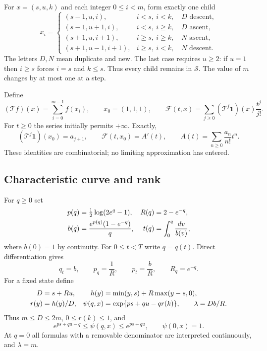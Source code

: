 \documentclass[11pt,letterpaper]{article}
\theoremstyle{remark}
\newcommand{\TT}{\mathcal T}
\newcommand{\FF}{\mathcal F}
\newcommand{\one}{\mathbf 1}
\newcommand{\calS}{\mathcal S}
\begin{document}
For $x=(s,u,k)$ and each integer $0\le i<m$, form exactly one child
\begin{equation}\label{a58:fn:eq:children}
 x_i=\begin{cases}
 (s-1,u,i),&i<s,\ i<k,\quad D\text{ descent},\\
 (s-1,u+1,i),&i<s,\ i\ge k,\quad D\text{ ascent},\\
 (s+1,u,i+1),&i\ge s,\ i\ge k,\quad N\text{ ascent},\\
 (s+1,u-1,i+1),&i\ge s,\ i<k,\quad N\text{ descent}.
 \end{cases}
\end{equation}
The letters $D,N$ mean duplicate and new. The last case requires $u\ge2$: if $u=1$ then $i\ge s$ forces $i=s$ and $k\le s$. Thus every child remains in $\calS$. The value of $m$ changes by at most one at a step.

Define
\begin{equation}\label{a58:fn:eq:operator}
 (\TT f)(x)=\sum_{i=0}^{m-1}f(x_i),\qquad x_0=(1,1,1),\qquad
 \FF(t,x)=\sum_{j\ge0}(\TT^j\one)(x)\frac{t^j}{j!}.
\end{equation}
For $t\ge0$ the series initially permits $+\infty$. Exactly,
\[
 (\TT^j\one)(x_0)=a_{j+1},\qquad
 \FF(t,x_0)=A'(t),\qquad A(t)=\sum_{n\ge0}\frac{a_n}{n!}t^n.
\]
These identities are combinatorial; no limiting approximation has entered.

\subsection{Characteristic curve and rank}
For $q\ge0$ set
\begin{align}\label{a58:fn:eq:params}
 p(q)&=\tfrac12\log(2e^q-1),& R(q)&=2-e^{-q},\notag\\
 b(q)&=\frac{e^{p(q)}(1-e^{-q})}{q},&
 t(q)&=\int_0^q\frac{dv}{b(v)},
\end{align}
where $b(0)=1$ by continuity. For $0\le t<T$ write $q=q(t)$. Direct differentiation gives
\begin{equation}\label{a58:fn:eq:flow}
 q_t=b,\qquad p_q=\frac1R,\qquad p_t=\frac bR,
 \qquad R_q=e^{-q}.
\end{equation}
For a fixed state define
\begin{align}\label{a58:fn:eq:profile}
 D&=s+Ru,& h(y)&=\min(y,s)+R\max(y-s,0),\notag\\
 r(y)&=h(y)/D,& \psi(q,x)&=\exp\{ps+qu-qr(k)\},\qquad
 \lambda=Db/R.
\end{align}
Thus $m\le D\le2m$, $0\le r(k)\le1$, and
\begin{equation}\label{a58:fn:eq:roughpsi}
 e^{ps+qu-q}\le\psi(q,x)\le e^{ps+qu},\qquad \psi(0,x)=1.
\end{equation}
At $q=0$ all formulas with a removable denominator are interpreted continuously, and $\lambda=m$.
\end{document}

